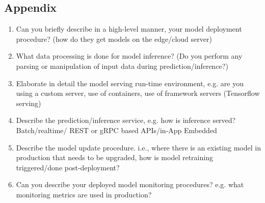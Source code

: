 \subsection{Appendix}
\begin{enumerate}
    \item Can you briefly describe in a high-level manner, your model deployment procedure? (how do they get models on the edge/cloud server)
    \item What data processing is done for model inference? (Do you perform any parsing or manipulation of input data during prediction/inference?)
    \item Elaborate in detail the model serving run-time environment, e.g. are you using a custom server, use of containers, use of framework servers (Tensorflow serving)
    \item Describe the prediction/inference service, e.g. how is inference served? Batch/realtime/ REST or gRPC based APIs/in-App Embedded
    \item Describe the model update procedure. i.e., where there is an existing model in production that needs to be upgraded, how is model retraining triggered/done post-deployment?
    \item Can you describe your deployed model monitoring procedures? e.g. what monitoring metrics are used in production?
\end{enumerate}